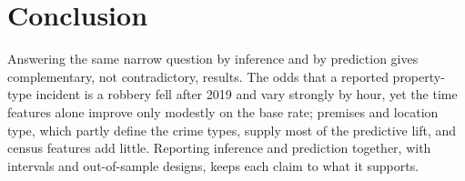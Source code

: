 \section{Conclusion}
Answering the same narrow question by inference and by prediction gives complementary, not contradictory, results. The odds that a reported property-type incident is a robbery fell after 2019 and vary strongly by hour, yet the time features alone improve only modestly on the base rate; premises and location type, which partly define the crime types, supply most of the predictive lift, and census features add little. Reporting inference and prediction together, with intervals and out-of-sample designs, keeps each claim to what it supports.
